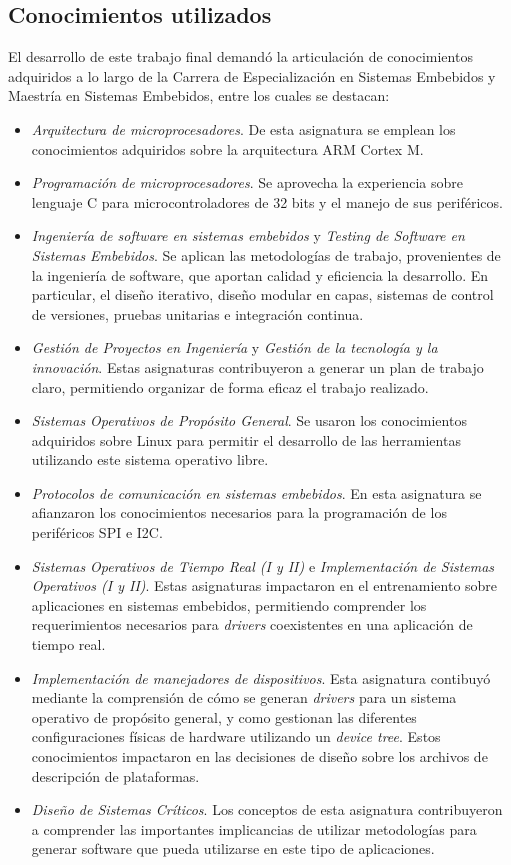 

\subsection{Conocimientos utilizados}

El desarrollo de este trabajo final demandó la articulación de conocimientos adquiridos a lo largo de la Carrera de Especialización en Sistemas Embebidos y Maestría en Sistemas Embebidos, entre los cuales se destacan:

\begin{itemize}
\item
\emph{Arquitectura de microprocesadores}. De esta asignatura se emplean los conocimientos adquiridos sobre la arquitectura ARM Cortex M. 
\item
\emph{Programación de microprocesadores}. Se aprovecha la experiencia sobre lenguaje C para microcontroladores de 32 bits y el manejo de sus periféricos.
\item
\emph{Ingeniería de software en sistemas embebidos} y \emph{Testing de Software en Sistemas Embebidos}. Se aplican las metodologías de trabajo, provenientes de la ingeniería de software, que aportan calidad y eficiencia la desarrollo. En particular, el diseño iterativo, diseño modular en capas, sistemas de control de versiones, pruebas unitarias e integración  continua.
\item
\emph{Gestión de Proyectos en Ingeniería} y \emph{Gestión de la tecnología y la innovación}. Estas asignaturas contribuyeron a generar un plan de trabajo claro, permitiendo organizar de forma eficaz el trabajo realizado. 
\item
\emph{Sistemas Operativos de Propósito General}. Se usaron los conocimientos adquiridos sobre Linux para permitir el desarrollo de las herramientas utilizando este sistema operativo libre.
\item
\emph{Protocolos de comunicación en sistemas embebidos}. En esta asignatura se afianzaron los conocimientos necesarios para la programación de los periféricos SPI e I2C.
\item
\emph{Sistemas Operativos de Tiempo Real (I y II)} e \emph{Implementación de Sistemas Operativos (I y II)}. Estas asignaturas impactaron en el entrenamiento sobre aplicaciones en sistemas embebidos, permitiendo comprender los requerimientos necesarios para \emph{drivers} coexistentes en una aplicación de tiempo real.
\item
\emph{Implementación de manejadores de dispositivos}. Esta asignatura contibuyó mediante la comprensión de cómo se generan \emph{drivers} para un sistema operativo de propósito general, y como gestionan las diferentes configuraciones físicas de hardware utilizando un \emph{device tree}. Estos conocimientos impactaron en las decisiones de diseño sobre los archivos de descripción de plataformas.
\item
\emph{Diseño de Sistemas Críticos}. Los conceptos de esta asignatura contribuyeron a comprender las importantes implicancias de utilizar metodologías para generar software que pueda utilizarse en este tipo de aplicaciones.
\end{itemize}

